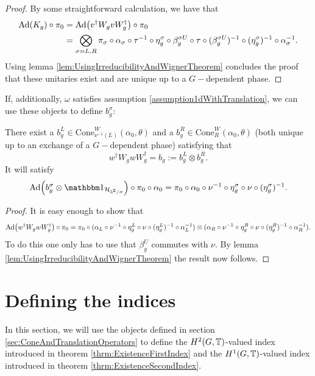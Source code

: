 \documentclass[11pt,a4paper,twoside]{article}
\numberwithin{equation}{section}
\begin{document}
	\begin{proof}
		By some straightforward calculation, we have that
		\begin{align}
			\Ad{K_g}\circ\pi_0&=\Ad{v^\dagger W_g v W_g^\dagger}\circ\pi_0\\
			&=\bigotimes_{\sigma=L,R}\pi_\sigma\circ\alpha_\sigma\circ\tau^{-1}\circ \eta_g^\sigma\circ\beta_g^{\sigma U}\circ\tau\circ(\beta_g^{\sigma U})^{-1}\circ(\eta_g^{\sigma})^{-1}\circ\alpha_\sigma^{-1}.
		\end{align}
		Using lemma \ref{lem:UsingIrreducibilityAndWignerTheorem} concludes the proof that these unitaries exist and are unique up to a $G-$dependent phase.
	\end{proof}
	If, additionally, $\omega$ satisfies assumption \ref{assumption1dWithTranslation}, we can use these objects to define $b^\sigma_g$:
	\begin{lemma}
		There exist a $b_g^L\in\textrm{Cone}_{\nu^{-1}(L)}^W(\alpha_0,\theta)$ and a $b_g^R\in\textrm{Cone}_{R}^W(\alpha_0,\theta)$ (both unique up to an exchange of a $G-$dependent phase) satisfying that
		\begin{equation}
			w^\dagger W_g w W_g^\dagger=b_g:=b_g^L\otimes b_g^R.
		\end{equation}
		It will satisfy
		\begin{equation}\label{eq:automorphismBelongingTo_b}
			\Ad{b_g^\sigma\otimes\id_{\HH_{\ZZ^2/\sigma}}}\circ\pi_0\circ\alpha_0=\pi_0\circ\alpha_0\circ\nu^{-1}\circ\eta_g^\sigma\circ\nu\circ(\eta_g^\sigma)^{-1}.
		\end{equation}
	\end{lemma}
	\begin{proof}
		It is easy enough to show that
		\begin{equation}
			\Ad{w^\dagger W_g w W_g^\dagger}\circ\pi_0=\pi_0\circ (\alpha_L\circ\nu^{-1}\circ\eta_g^L\circ\nu\circ(\eta_g^L)^{-1}\circ\alpha_L^{-1})\otimes(\alpha_R\circ\nu^{-1}\circ\eta_g^R\circ\nu\circ(\eta_g^R)^{-1}\circ\alpha_R^{-1}).
		\end{equation}
		To do this one only has to use that $\beta_g^U$ commutes with $\nu$. By lemma \ref{lem:UsingIrreducibilityAndWignerTheorem} the result now follows.
	\end{proof}
	\section{Defining the indices}
	In this section, we will use the objects defined in section \ref{sec:ConeAndTranslationOperators} to define the $H^2(G,\mathbb T)$-valued index introduced in theorem \ref{thrm:ExistenceFirstIndex} and the $H^1(G,\mathbb T)$-valued index introduced in theorem \ref{thrm:ExistenceSecondIndex}.
\end{document}
